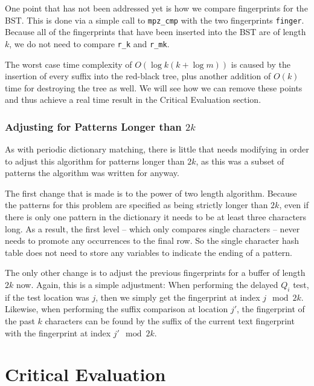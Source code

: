 \documentclass[ %
                    author={Dominic Joseph Moylett},
                    degree={MEng},
                     title={Dictionary Matching with Fingerprints},
                  subtitle={An Empirical Analysis},
                      type={research},
                      year={2015} ]{dissertation}
\begin{document}
One point that has not been addressed yet is how we compare fingerprints for the BST. This is done via a simple call to \texttt{mpz\_cmp} with the two fingerprints \texttt{finger}. Because all of the fingerprints that have been inserted into the BST are of length $k$, we do not need to compare \texttt{r\_k} and \texttt{r\_mk}.

The worst case time complexity of $O(\log k(k + \log m))$ is caused by the insertion of every suffix into the red-black tree, plus another addition of $O(k)$ time for destroying the tree as well. We will see how we can remove these points and thus achieve a real time result in the Critical Evaluation section.

\subsection{Adjusting for Patterns Longer than $2k$}

As with periodic dictionary matching, there is little that needs modifying in order to adjust this algorithm for patterns longer than $2k$, as this was a subset of patterns the algorithm was written for anyway.

The first change that is made is to the power of two length algorithm. Because the patterns for this problem are specified as being strictly longer than $2k$, even if there is only one pattern in the dictionary it needs to be at least three characters long. As a result, the first level -- which only compares single characters -- never needs to promote any occurrences to the final row. So the single character hash table does not need to store any variables to indicate the ending of a pattern.

The only other change is to adjust the previous fingerprints for a buffer of length $2k$ now. Again, this is a simple adjustment: When performing the delayed $Q_i$ test, if the test location was $j$, then we simply get the fingerprint at index $j \mod 2k$. Likewise, when performing the suffix comparison at location $j'$, the fingerprint of the past $k$ characters can be found by the suffix of the current text fingerprint with the fingerprint at index $j' \mod 2k$.


\chapter{Critical Evaluation}
\label{chap:evaluation}
\end{document}
